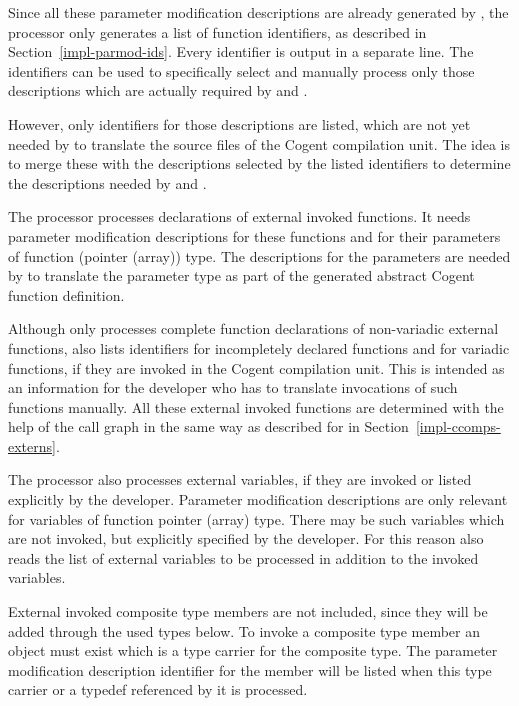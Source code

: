 Since all these parameter modification descriptions are already
generated by , the processor only generates a list of function identifiers, as described in 
Section~\ref{impl-parmod-ids}. Every identifier is output in a separate line. The identifiers can be used
to specifically select and manually process only those descriptions which are actually required by
 and . 

However, only identifiers for those descriptions are listed,
which are not yet needed by  to translate the source files of the Cogent compilation unit.
The idea is to merge these with the descriptions selected by the listed identifiers to determine the 
descriptions needed by  and .

The processor  processes declarations of external invoked functions. It needs parameter
modification descriptions for these functions and for their parameters of function (pointer (array)) type.
The descriptions for the parameters are needed by  to translate the parameter type as part of the 
generated abstract Cogent function definition. 

Although  only processes complete function declarations of non-variadic external functions, 
 also lists identifiers for incompletely declared functions and for variadic functions,
if they are invoked in the Cogent compilation unit. This is intended as an 
information for the developer who has to translate invocations of such functions manually. All these
external invoked functions are determined with the help of the call graph in the same way as described for 
 in Section~\ref{impl-ccomps-externs}.

The processor  also processes external variables, if they are invoked or listed explicitly
by the developer. Parameter modification descriptions are only relevant for variables of function pointer (array)
type. There may be such variables which are not invoked, but explicitly specified by the developer. For this
reason  also reads the list of external variables to be processed in addition to the
invoked variables.

External invoked composite type members are not included, since they will be added through the used types below. To invoke 
a composite type member an object must exist which is a type carrier for the composite type. The parameter modification
description identifier for the member will be listed when this type carrier or a typedef referenced by it
is processed.

